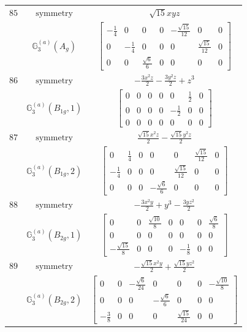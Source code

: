\documentclass[fleqn,8pt,landscape]{jsarticle}
\begin{document}
\begin{longtable}{ccc}
$ 85 $ & $ \text{symmetry} $ & $ \sqrt{15} x y z $ \\
$  $ & $ \mathbb{G}_{3}^{(a)}(A_{g}) $ & $ \begin{bmatrix} - \frac{1}{4} & 0 & 0 & 0 & - \frac{\sqrt{15}}{12} & 0 & 0 \\ 0 & - \frac{1}{4} & 0 & 0 & 0 & \frac{\sqrt{15}}{12} & 0 \\ 0 & 0 & \frac{\sqrt{6}}{6} & 0 & 0 & 0 & 0 \end{bmatrix} $ \\ \hline
$ 86 $ & $ \text{symmetry} $ & $ - \frac{3 x^{2} z}{2} - \frac{3 y^{2} z}{2} + z^{3} $ \\
$  $ & $ \mathbb{G}_{3}^{(a)}(B_{1g},1) $ & $ \begin{bmatrix} 0 & 0 & 0 & 0 & 0 & \frac{1}{2} & 0 \\ 0 & 0 & 0 & 0 & - \frac{1}{2} & 0 & 0 \\ 0 & 0 & 0 & 0 & 0 & 0 & 0 \end{bmatrix} $ \\ \hline
$ 87 $ & $ \text{symmetry} $ & $ \frac{\sqrt{15} x^{2} z}{2} - \frac{\sqrt{15} y^{2} z}{2} $ \\
$  $ & $ \mathbb{G}_{3}^{(a)}(B_{1g},2) $ & $ \begin{bmatrix} 0 & \frac{1}{4} & 0 & 0 & 0 & \frac{\sqrt{15}}{12} & 0 \\ - \frac{1}{4} & 0 & 0 & 0 & \frac{\sqrt{15}}{12} & 0 & 0 \\ 0 & 0 & 0 & - \frac{\sqrt{6}}{6} & 0 & 0 & 0 \end{bmatrix} $ \\ \hline
$ 88 $ & $ \text{symmetry} $ & $ - \frac{3 x^{2} y}{2} + y^{3} - \frac{3 y z^{2}}{2} $ \\
$  $ & $ \mathbb{G}_{3}^{(a)}(B_{2g},1) $ & $ \begin{bmatrix} 0 & 0 & \frac{\sqrt{10}}{8} & 0 & 0 & 0 & \frac{\sqrt{6}}{8} \\ 0 & 0 & 0 & 0 & 0 & 0 & 0 \\ - \frac{\sqrt{15}}{8} & 0 & 0 & 0 & - \frac{1}{8} & 0 & 0 \end{bmatrix} $ \\ \hline
$ 89 $ & $ \text{symmetry} $ & $ - \frac{\sqrt{15} x^{2} y}{2} + \frac{\sqrt{15} y z^{2}}{2} $ \\
$  $ & $ \mathbb{G}_{3}^{(a)}(B_{2g},2) $ & $ \begin{bmatrix} 0 & 0 & - \frac{\sqrt{6}}{24} & 0 & 0 & 0 & - \frac{\sqrt{10}}{8} \\ 0 & 0 & 0 & - \frac{\sqrt{6}}{6} & 0 & 0 & 0 \\ - \frac{3}{8} & 0 & 0 & 0 & \frac{\sqrt{15}}{24} & 0 & 0 \end{bmatrix} $ \\ \hline

\end{longtable}
\end{document}
